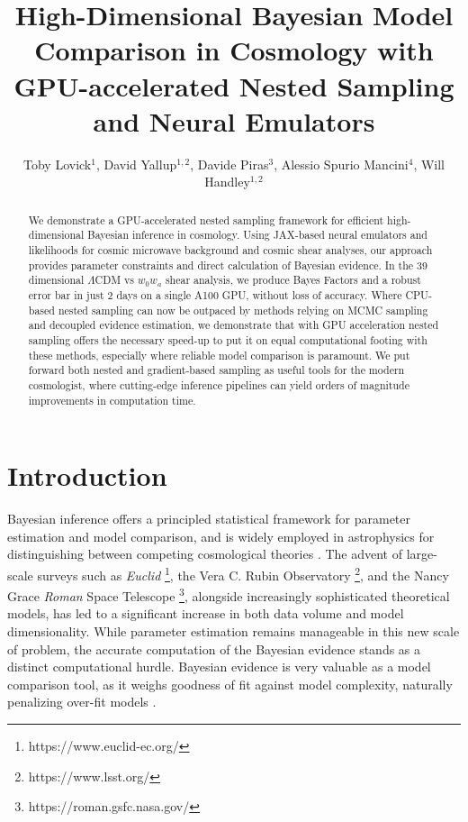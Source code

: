 \documentclass[twocolumn]{openjournal}
\begin{document}
\title{High-Dimensional Bayesian Model Comparison in Cosmology with GPU-accelerated Nested Sampling and Neural Emulators}

\author{Toby Lovick$^{1}$, David Yallup$^{1,2}$, Davide Piras$^{3}$, Alessio Spurio Mancini$^{4}$, Will Handley$^{1,2}$}


\begin{abstract}
We demonstrate a GPU-accelerated nested sampling framework for efficient high-dimensional Bayesian inference in cosmology. Using JAX-based neural emulators and likelihoods for cosmic microwave background and cosmic shear analyses, our approach provides parameter constraints and direct calculation of Bayesian evidence. In the 39 dimensional $\Lambda$CDM vs $w_0w_a$ shear analysis, we produce Bayes Factors and a robust error bar in just 2 days on a single A100 GPU, without loss of accuracy. Where CPU-based nested sampling can now be outpaced by methods relying on MCMC sampling and decoupled evidence estimation, we demonstrate that with GPU acceleration nested sampling offers the necessary speed-up to put it on equal computational footing with these methods, especially where reliable model comparison is paramount. We put forward both nested and gradient-based sampling as useful tools for the modern cosmologist, where cutting-edge inference pipelines can yield orders of magnitude improvements in computation time.
\end{abstract}

\section{Introduction}  
\label{sec:introduction}
Bayesian inference offers a principled statistical framework for parameter estimation and model comparison, and is widely employed in astrophysics for distinguishing between competing cosmological theories \citep{Trotta_2008}. The advent of large-scale surveys such as \textit{Euclid} \citep{Euclid_2025}\footnote{https://www.euclid-ec.org/}, the Vera C. Rubin Observatory \citep{Vera}\footnote{https://www.lsst.org/}, and the Nancy Grace \textit{Roman} Space Telescope \citep{nancy}\footnote{https://roman.gsfc.nasa.gov/}, alongside increasingly sophisticated theoretical models, has led to a significant increase in both data volume and model dimensionality. While parameter estimation remains manageable in this new scale of problem, the accurate computation of the Bayesian evidence stands as a distinct computational hurdle. Bayesian evidence is very valuable as a model comparison tool, as it weighs goodness of fit against model complexity, naturally penalizing over-fit models \citep{Trotta07, Lovick:2023tnv}.
\end{document}

